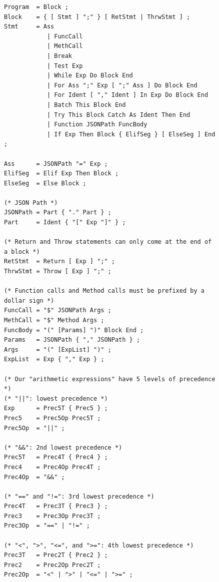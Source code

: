 \documentclass[]{full}
\theoremstyle{definition}
\begin{document}
\begin{figure}[H]\ContinuedFloat
    \begin{verbatim}
Program  = Block ;
Block    = { [ Stmt ] ";" } [ RetStmt | ThrwStmt ] ;
Stmt     = Ass
            | FuncCall
            | MethCall
            | Break
            | Test Exp
            | While Exp Do Block End
            | For Ass ";" Exp [ ";" Ass ] Do Block End
            | For Ident [ "," Ident ] In Exp Do Block End
            | Batch This Block End
            | Try This Block Catch As Ident Then End
            | Function JSONPath FuncBody
            | If Exp Then Block { ElifSeg } [ ElseSeg ] End ;

Ass      = JSONPath "=" Exp ;
ElifSeg  = Elif Exp Then Block ;
ElseSeg  = Else Block ;

(* JSON Path *)
JSONPath = Part { "." Part } ;
Part     = Ident { "[" Exp "]" } ;

(* Return and Throw statements can only come at the end of a block *)
RetStmt  = Return [ Exp ] ";" ;
ThrwStmt = Throw [ Exp ] ";" ;

(* Function calls and Method calls must be prefixed by a dollar sign *)
FuncCall = "$" JSONPath Args ;
MethCall = "$" Method Args ;
FuncBody = "(" [Params] ")" Block End ;
Params   = JSONPath { "," JSONPath } ;
Args     = "(" [ExpList] ")" ;
ExpList  = Exp { "," Exp } ;

(* Our "arithmetic expressions" have 5 levels of precedence *)
(* "||": lowest precedence *)
Exp      = Prec5T { Prec5 } ;
Prec5    = Prec5Op Prec5T ;
Prec5Op  = "||" ;

(* "&&": 2nd lowest precedence *)
Prec5T   = Prec4T { Prec4 } ;
Prec4    = Prec4Op Prec4T ;
Prec4Op  = "&&" ;

(* "==" and "!=": 3rd lowest precedence *)
Prec4T   = Prec3T { Prec3 } ;
Prec3    = Prec3Op Prec3T ;
Prec3Op  = "==" | "!=" ;

(* "<", ">", "<=", and ">=": 4th lowest precedence *)
Prec3T   = Prec2T { Prec2 } ;
Prec2    = Prec2Op Prec2T ;
Prec2Op  = "<" | ">" | "<=" | ">=" ;
    \end{verbatim}
\end{figure}
\end{document}
